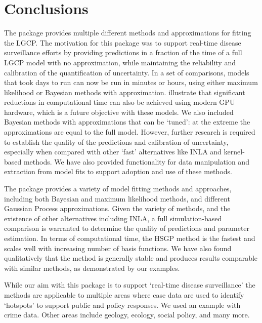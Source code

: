 \section{Conclusions}
The  package provides multiple different methods and approximations for fitting the LGCP. The motivation for this package was to support real-time disease surveillance efforts by providing predictions in a fraction of the time of a full LGCP model with no approximation, while maintaining the reliability and calibration of the quantification of uncertainty. In a set of comparisons, models that took days to run can now be run in minutes or hours, using either maximum likelihood or Bayesian methods with approximation. \citet{Watson2026} illustrate that significant reductions in computational time can also be achieved using modern GPU hardware, which is a future objective with these models. We also included Bayesian methods with approximations that can be `tuned': at the extreme the approximations are equal to the full model. However, further research is required to establish the quality of the predictions and calibration of uncertainty, especially when compared with other `fast' alternatives like INLA and kernel-based methods. We have also provided functionality for data manipulation and extraction from model fits to support adoption and use of these methods. 

The package provides a variety of model fitting methods and approaches, including both Bayesian and maximum likelihood methods, and different Gaussian Process approximations. Given the variety of methods, and the existence of other alternatives including INLA, a full simulation-based comparison is warranted to determine the quality of predictions and parameter estimation. In terms of computational time, the HSGP method is the fastest and scales well with increasing number of basis functions. We have also found qualitatively that the method is generally stable and produces results comparable with similar methods, as demonstrated by our examples. 

While our aim with this package is to support `real-time disease surveillance' the methods are applicable to multiple areas where case data are used to identify `hotspots' to support public and policy responses. We used an example with crime data. Other areas include geology, ecology, social policy, and many more.


